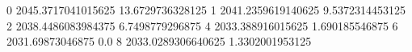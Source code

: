 0 2045.3717041015625 13.6729736328125
1 2041.2359619140625 9.5372314453125
2 2038.4486083984375 6.7498779296875
4 2033.388916015625 1.690185546875
6 2031.69873046875 0.0
8 2033.0289306640625 1.3302001953125

